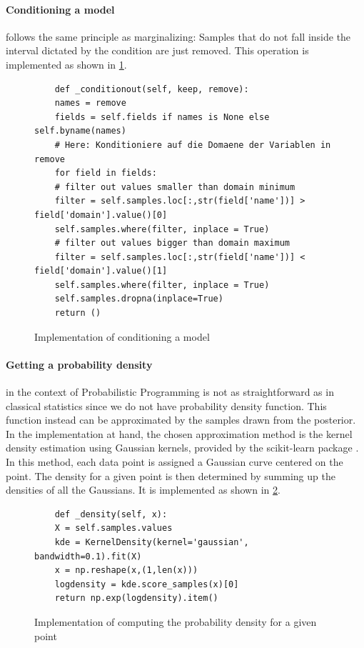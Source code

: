 \documentclass{article}
\begin{document}
\paragraph{Conditioning a model} follows the same principle as marginalizing: Samples that do not fall inside the interval dictated by the condition are just removed. This operation is implemented as shown in \ref{fig:code_conditioning_a_model}.
\begin{figure}[h]
	\begin{lstlisting}
	def _conditionout(self, keep, remove):
	names = remove
	fields = self.fields if names is None else self.byname(names)
	# Here: Konditioniere auf die Domaene der Variablen in remove
	for field in fields:
	# filter out values smaller than domain minimum
	filter = self.samples.loc[:,str(field['name'])] > field['domain'].value()[0]
	self.samples.where(filter, inplace = True)
	# filter out values bigger than domain maximum
	filter = self.samples.loc[:,str(field['name'])] < field['domain'].value()[1]
	self.samples.where(filter, inplace = True)
	self.samples.dropna(inplace=True)
	return ()
	\end{lstlisting}
	\caption[Implementation of conditioning a model]{Implementation of conditioning a model}
	\label{fig:code_conditioning_a_model}
\end{figure}

\paragraph{Getting a probability density} in the context of Probabilistic Programming is not as straightforward as in classical statistics since we do not have probability density function. This function instead can be approximated by the samples drawn from the posterior. In the implementation at hand, the chosen approximation method is the kernel density estimation using Gaussian kernels, provided by the scikit-learn package \cite{scikit-learn}. In this method, each data point is assigned a Gaussian curve centered on the point. The density for a given point is then determined by summing up the densities of all the Gaussians. It is implemented as shown in \ref{fig:code_probability_density}.
\begin{figure}[h]
	\begin{lstlisting}
	def _density(self, x):
	X = self.samples.values
	kde = KernelDensity(kernel='gaussian', bandwidth=0.1).fit(X)
	x = np.reshape(x,(1,len(x)))
	logdensity = kde.score_samples(x)[0]
	return np.exp(logdensity).item()
	\end{lstlisting}
	\caption[Implementation of computing the probability density for a given point]{Implementation of computing the probability density for a given point}
	\label{fig:code_probability_density}
\end{figure}
\end{document}
